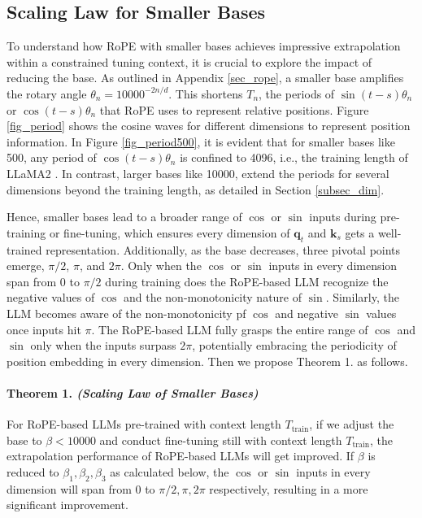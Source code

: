 \subsection{Scaling Law for Smaller Bases}\label{subsec_small}

To understand how RoPE with smaller bases achieves impressive extrapolation within a constrained tuning context, it is crucial to explore the impact of reducing the base. As outlined in Appendix \ref{sec_rope}, a smaller base amplifies the rotary angle $\theta_n={10000}^{-2n/d}$. This shortens $T_n$, the periods of $\sin{(t-s)\theta_n}$ or $\cos{(t-s)\theta_n}$ that RoPE uses to represent relative positions. Figure \ref{fig_period} shows the cosine waves for different dimensions to represent position information. In Figure \ref{fig_period500}, it is evident that for smaller bases like 500, any period of $\cos{(t-s)\theta_n}$ is confined to 4096, i.e., the training length of LLaMA2 \citep{touvron2023llama2}. In contrast, larger bases like 10000, extend the periods for several dimensions beyond the training length, as detailed in Section  \ref{subsec_dim}. 

Hence, smaller bases lead to a broader range of $\cos$ or $\sin$ inputs during pre-training or fine-tuning, which ensures every dimension of $\bm{q}_t$ and $\bm{k}_s$ gets a well-trained representation. Additionally, as the base decreases, three pivotal points emerge, $\pi/2$, $\pi$, and $2\pi$. Only when the $\cos$ or $\sin$ inputs in every dimension span from 0 to $\pi/2$ during training does the RoPE-based LLM recognize the negative values of $\cos$ and the non-monotonicity nature of $\sin$. Similarly, the LLM becomes aware of the non-monotonicity pf $\cos$ and negative $\sin$ values once inputs hit $\pi$. The RoPE-based LLM fully grasps the entire range of $\cos$ and $\sin$ only when the inputs surpass $2\pi$, potentially embracing the periodicity of position embedding in every dimension. Then we propose Theorem 1. as follows.

\paragraph{Theorem 1. \textit{(Scaling Law of Smaller Bases)} } For RoPE-based LLMs pre-trained with context length $T_\text{train}$, if we adjust the base to $\beta<10000$ and conduct fine-tuning still with context length $T_\text{train}$, the extrapolation performance of RoPE-based LLMs will get improved. If $\beta$ is reduced to $\beta_1,\beta_2,\beta_3$ as calculated below, the $\cos$ or $\sin$ inputs in every dimension will span from 0 to $\pi/2,\pi,2\pi$ respectively, resulting in a more significant improvement.

